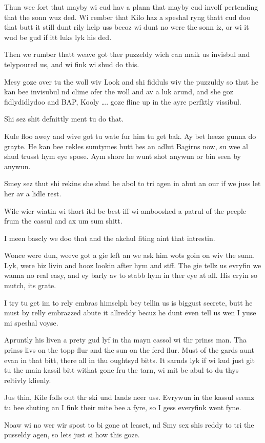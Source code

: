 Thun wee fort thut mayby wi cud hav a plann that mayby cud involf pertending that the sonn wuz ded. Wi rember that Kilo haz a speshal ryng thatt cud doo that butt it still dunt rily help uss becoz wi dunt no were the sonn iz, or wi it wud be gud if itt luks lyk his ded.\medskip

Then we rumber thatt weave got ther puzzeldy wich can maik us invisbul and telypoured us, and wi fink wi shud do this.\medskip

Mesy goze over tu the woll wiv Look and shi fidduls wiv the puzzuldy so thut he kan bee invisubul nd clime ofer the woll and av a luk arund, and she goz fidlydidlydoo and BAP, Kooly \ldots. goze fline up in the ayre perfktly vissibul.\medskip

Shi sez shit defnittly ment tu do that.\medskip

Kule floo awey and wive got tu wate fur him tu get bak. Ay bet heeze gunna do grayte. He kan bee rekles sumtymes butt hes an adlut Bagirns now, su wee al shud trusst hym eye spose. Aym shore he wunt shot anywun or bin seen by anywun.\medskip

Smey sez thut shi rekins she shud be abol to tri agen in abut an our if we juss let her av a lidle rest.\medskip

Wile wier wiatin wi thort itd be best iff wi ambooshed a patrul of the peeple frum the cassul and ax um sum shitt.\medskip

I meen bascly we doo that and the akchul fiting aint that intrestin.\medskip

Wonce were dun, weeve got a gie left an we ask him wots goin on wiv the sunn. Lyk, were hiz livin and hooz lookin after hym and stff. The gie tellz us evryfin we wanna no real easy, and ey barly av to stabb hym in ther eye at all. His cryin so mutch, its grate.\medskip

I try tu get im to rely embras himselph bey tellin us is biggust secrete, butt he must by relly embrazzed abute it allreddy becuz he dunt even tell us wen I yuse mi speshal voyse.\medskip

Apruntly his liven a prety gud lyf in tha mayn cassol wi thr prinss man. Tha prinss livs on the topp flur and the sun on the ferd flur. Must of the gards aunt evan in that bitt, there all in thu oughtsyd bitts. It sarnds lyk if wi kud just git tu the main kassil bitt withat gone fru the tarn, wi mit be abul to du thys reltivly klienly.\medskip

Jus thin, Kile folls out thr ski und lands neer uss. Evrywun in the kassul seemz tu bee shuting an I fink their mite bee a fyre, so I gess everyfink went fyne.\medskip

Noaw wi no wer wir spost to bi gone at leaset, nd Smy sex shis reddy to tri the pusseldy agen, so lets just si how this goze.

\vspace*{5mm}
